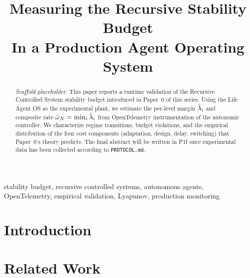 \documentclass[conference]{IEEEtran}
\title{Measuring the Recursive Stability Budget\\
In a Production Agent Operating System}
\author{
  \IEEEauthorblockN{Carlos D. Escobar-Valbuena}
  \IEEEauthorblockA{
    Broomva Research\\
    Bogot\'a, Colombia\\
    carlosdavidescobar@gmail.com
  }
}
\begin{document}
\maketitle

\begin{abstract}
\emph{Scaffold placeholder.} This paper reports a runtime validation of
the Recursive Controlled System stability budget introduced in Paper~0
of this series. Using the Life Agent OS as the experimental plant, we
estimate the per-level margin $\hat{\lambda}_i$ and composite rate
$\hat{\omega}_N = \min_i \hat{\lambda}_i$ from OpenTelemetry
instrumentation of the autonomic controller. We characterize regime
transitions, budget violations, and the empirical distribution of the
four cost components (adaptation, design, delay, switching) that
Paper~0's theory predicts. The final abstract will be written in
P1f once experimental data has been collected according to
\texttt{PROTOCOL.md}.
\end{abstract}

\begin{IEEEkeywords}
  stability budget, recursive controlled systems, autonomous agents,
  OpenTelemetry, empirical validation, Lyapunov, production monitoring
\end{IEEEkeywords}

\section{Introduction}
\label{sec:introduction}

\section{Related Work}
\label{sec:related}

\end{document}
